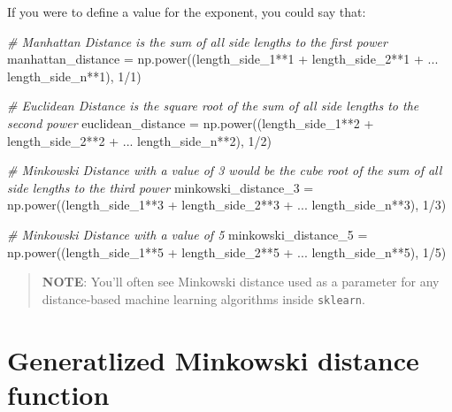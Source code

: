 \documentclass[11pt]{article}
\newenvironment{Shaded}{}{}
\newcommand{\DecValTok}[1]{\textcolor[rgb]{0.25,0.63,0.44}{{#1}}}
\newcommand{\CommentTok}[1]{\textcolor[rgb]{0.38,0.63,0.69}{\textit{{#1}}}}
\newcommand{\NormalTok}[1]{{#1}}
\newcommand{\OperatorTok}[1]{\textcolor[rgb]{0.40,0.40,0.40}{{#1}}}
\begin{document}
If you were to define a value for the exponent, you could say that:

\begin{Shaded}
\begin{Highlighting}[]
\CommentTok{\# Manhattan Distance is the sum of all side lengths to the first power}
\NormalTok{manhattan\_distance }\OperatorTok{=}\NormalTok{ np.power((length\_side\_1}\OperatorTok{**}\DecValTok{1} \OperatorTok{+}\NormalTok{ length\_side\_2}\OperatorTok{**}\DecValTok{1} \OperatorTok{+}\NormalTok{ ... length\_side\_n}\OperatorTok{**}\DecValTok{1}\NormalTok{), }\DecValTok{1}\OperatorTok{/}\DecValTok{1}\NormalTok{) }

\CommentTok{\# Euclidean Distance is the square root of the sum of all side lengths to the second power}
\NormalTok{euclidean\_distance }\OperatorTok{=}\NormalTok{ np.power((length\_side\_1}\OperatorTok{**}\DecValTok{2} \OperatorTok{+}\NormalTok{ length\_side\_2}\OperatorTok{**}\DecValTok{2} \OperatorTok{+}\NormalTok{ ... length\_side\_n}\OperatorTok{**}\DecValTok{2}\NormalTok{), }\DecValTok{1}\OperatorTok{/}\DecValTok{2}\NormalTok{)}

\CommentTok{\# Minkowski Distance with a value of 3 would be the cube root of the sum of all side lengths to the third power}
\NormalTok{minkowski\_distance\_3 }\OperatorTok{=}\NormalTok{ np.power((length\_side\_1}\OperatorTok{**}\DecValTok{3} \OperatorTok{+}\NormalTok{ length\_side\_2}\OperatorTok{**}\DecValTok{3} \OperatorTok{+}\NormalTok{ ... length\_side\_n}\OperatorTok{**}\DecValTok{3}\NormalTok{), }\DecValTok{1}\OperatorTok{/}\DecValTok{3}\NormalTok{)}

\CommentTok{\# Minkowski Distance with a value of 5}
\NormalTok{minkowski\_distance\_5 }\OperatorTok{=}\NormalTok{ np.power((length\_side\_1}\OperatorTok{**}\DecValTok{5} \OperatorTok{+}\NormalTok{ length\_side\_2}\OperatorTok{**}\DecValTok{5} \OperatorTok{+}\NormalTok{ ... length\_side\_n}\OperatorTok{**}\DecValTok{5}\NormalTok{), }\DecValTok{1}\OperatorTok{/}\DecValTok{5}\NormalTok{)}
\end{Highlighting}
\end{Shaded}

\begin{quote}
\textbf{NOTE}: You'll often see Minkowski distance used as a parameter
for any distance-based machine learning algorithms inside
\texttt{sklearn}.
\end{quote}

    \hypertarget{generatlized-minkowski-distance-function}{%
\section{Generatlized Minkowski distance
function}\label{generatlized-minkowski-distance-function}}
\end{document}

